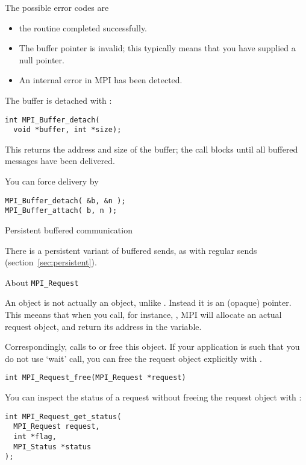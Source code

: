 
The possible error codes are
\begin{itemize}
\item {} the routine completed successfully.
\item {} The buffer pointer is invalid;
  this typically means that you have supplied a null pointer.
\item {} An internal error in MPI has been detected.
\end{itemize}

The buffer is detached with :
\begin{lstlisting}
int MPI_Buffer_detach(
  void *buffer, int *size);
\end{lstlisting}
This returns the address and size of the buffer; the call blocks
until all buffered messages have been delivered.

You can force delivery by
\begin{lstlisting}
MPI_Buffer_detach( &b, &n );
MPI_Buffer_attach( b, n );
\end{lstlisting}

 {Persistent buffered communication}

There is a persistent variant of buffered sends, as with regular
sends (section~\ref{sec:persistent}).


 {About \texttt{MPI\_Request}}
\label{ref:mpirequest}

An  object is not actually an object,
unlike . Instead it is an (opaque) pointer.
This meeans that when you call, for instance, ,
MPI will allocate an actual request object, and return its
address in the  variable.

Correspondingly, calls to  or 
free this object.
If your application is such that you do not use `wait' call, you can free the
request object explicitly
with .
\begin{lstlisting}
int MPI_Request_free(MPI_Request *request)
\end{lstlisting}

You can inspect the status of a request without freeing the request object
with :
\begin{lstlisting}
int MPI_Request_get_status(
  MPI_Request request,
  int *flag,
  MPI_Status *status
);
\end{lstlisting}

